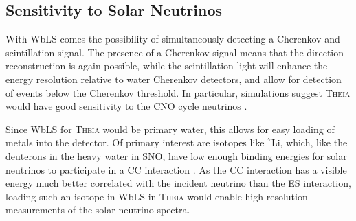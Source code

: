 \subsection{Sensitivity to Solar Neutrinos}
With WbLS comes the possibility of simultaneously detecting a Cherenkov and scintillation signal.
The presence of a Cherenkov signal means that the direction reconstruction is again possible, while the scintillation light will enhance the energy resolution relative to water Cherenkov detectors, and allow for detection of events below the Cherenkov threshold.
In particular, simulations suggest \textsc{Theia} would have good sensitivity to the CNO cycle neutrinos \cite{theia_solar}.

Since WbLS for \textsc{Theia} would be primary water, this allows for easy loading of metals into the detector.
Of primary interest are isotopes like $^7$Li, which, like the deuterons in the heavy water in SNO, have low enough binding energies for solar neutrinos to participate in a CC interaction \cite{asdc_paper}.
As the CC interaction has a visible energy much better correlated with the incident neutrino than the ES interaction, loading such an isotope in WbLS in \textsc{Theia} would enable high resolution measurements of the solar neutrino spectra. 



